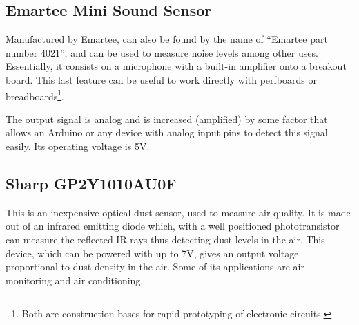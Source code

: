 
\subsection{Emartee Mini Sound Sensor}
\label{sub:sound}

Manufactured by Emartee, can also be found by the name of ``Emartee part number 4021'', and can be used to measure noise levels among other uses. Essentially, it consists on a microphone with a built-in amplifier onto a breakout board. This last feature can be useful to work directly with perfboards or breadboards\footnote{Both are construction bases for rapid prototyping of electronic circuits.}.

The output signal is analog and is increased (amplified) by some factor that allows an Arduino or any device with analog input pins to detect this signal easily\cite{gertz2012environmental}. Its operating voltage is 5V.



\subsection{Sharp GP2Y1010AU0F}
\label{sub:sharp}

This is an inexpensive optical dust sensor, used to measure air quality. It is made out of an infrared emitting diode which, with a well positioned phototransistor can measure the reflected IR rays thus detecting dust levels in the air\cite{sharp}. This device, which can be powered with up to 7V, gives an output voltage proportional to dust density in the air. Some of its applications are air monitoring and air conditioning.

